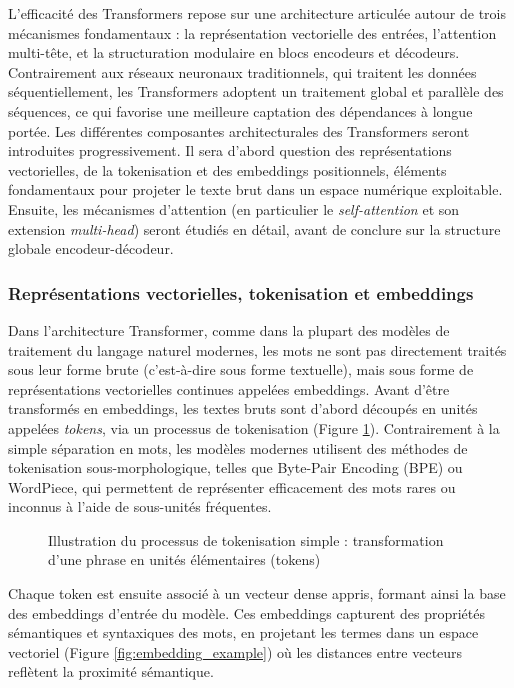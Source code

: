 L’efficacité des Transformers repose sur une architecture articulée autour de trois mécanismes fondamentaux : la représentation vectorielle des entrées, l’attention multi-tête, et la structuration modulaire en blocs encodeurs et décodeurs. Contrairement aux réseaux neuronaux traditionnels, qui traitent les données séquentiellement, les Transformers adoptent un traitement global et parallèle des séquences, ce qui favorise une meilleure captation des dépendances à longue portée. Les différentes composantes architecturales des Transformers seront introduites progressivement. Il sera d’abord question des représentations vectorielles, de la tokenisation et des embeddings positionnels, éléments fondamentaux pour projeter le texte brut dans un espace numérique exploitable. Ensuite, les mécanismes d’attention (en particulier le \textit{self-attention} et son extension \textit{multi-head}) seront étudiés en détail, avant de conclure sur la structure globale encodeur-décodeur.

\subsubsection{Représentations vectorielles, tokenisation et embeddings} 

Dans l’architecture Transformer, comme dans la plupart des modèles de traitement du langage naturel modernes, les mots ne sont pas directement traités sous leur forme brute (c'est-à-dire sous forme textuelle), mais sous forme de représentations vectorielles continues appelées embeddings. Avant d’être transformés en embeddings, les textes bruts sont d’abord découpés en unités appelées \textit{tokens}, via un processus de tokenisation (Figure \ref{fig:tokenization_example}). Contrairement à la simple séparation en mots, les modèles modernes utilisent des méthodes de tokenisation sous-morphologique, telles que Byte-Pair Encoding (BPE) ou WordPiece, qui permettent de représenter efficacement des mots rares ou inconnus à l’aide de sous-unités fréquentes. 

\begin{figure}[H]
    \centering
    
    \caption{Illustration du processus de tokenisation simple : transformation d'une phrase en unités élémentaires (tokens)}
    \label{fig:tokenization_example}
\end{figure}

Chaque token est ensuite associé à un vecteur dense appris, formant ainsi la base des embeddings d'entrée du modèle. Ces embeddings capturent des propriétés sémantiques et syntaxiques des mots, en projetant les termes dans un espace vectoriel (Figure \ref{fig:embedding_example}) où les distances entre vecteurs reflètent la proximité sémantique.

